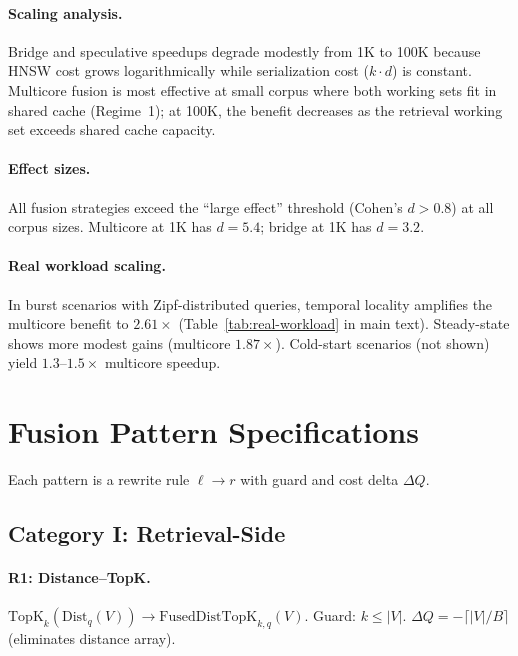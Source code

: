 \documentclass{article}
\theoremstyle{definition}
\theoremstyle{remark}
\newcommand{\ceil}[1]{\lceil #1 \rceil}
\begin{document}
\paragraph{Scaling analysis.}
Bridge and speculative speedups degrade modestly from 1K to 100K because HNSW cost grows logarithmically while serialization cost ($k \cdot d$) is constant.
Multicore fusion is most effective at small corpus where both working sets fit in shared cache (Regime~1); at 100K, the benefit decreases as the retrieval working set exceeds shared cache capacity.

\paragraph{Effect sizes.}
All fusion strategies exceed the ``large effect'' threshold (Cohen's $d > 0.8$) at all corpus sizes. Multicore at 1K has $d = 5.4$; bridge at 1K has $d = 3.2$.

\paragraph{Real workload scaling.}
In burst scenarios with Zipf-distributed queries, temporal locality amplifies the multicore benefit to $2.61\times$ (Table~\ref{tab:real-workload} in main text). Steady-state shows more modest gains (multicore $1.87\times$). Cold-start scenarios (not shown) yield $1.3$--$1.5\times$ multicore speedup.

\section{Fusion Pattern Specifications}\label{app:pattern-specs}

Each pattern is a rewrite rule $\ell \to r$ with guard and cost delta $\Delta Q$.

\subsection{Category I: Retrieval-Side}

\paragraph{R1: Distance--TopK.}
$\mathrm{TopK}_k(\mathrm{Dist}_q(V)) \to \mathrm{FusedDistTopK}_{k,q}(V)$.
Guard: $k \leq |V|$. $\Delta Q = -\ceil{|V|/B}$ (eliminates distance array).
\end{document}
